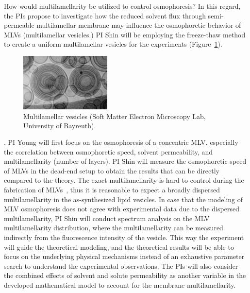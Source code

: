\documentclass[11pt]{article}
\begin{document}
How would multilamellarity be utilized to control osmophoresis?  In this
regard, the PIs propose to investigate how the reduced solvent flux
through semi-permeable multilamellar membrane may influence the
osmophoretic behavior of MLVs (multilamellar vesicles.) PI Shin will be
employing the freeze-thaw method to create a uniform multilamellar
vesicles for the experiments (Figure~\ref{fig:Multilamellar}).
\begin{figure}
\centerline{\includegraphics[width=1.8in]{figs/Multilamellar.pdf}}
\caption{\footnotesize Multilamellar vesicles (Soft Matter Electron Microscopy Lab, University of Bayreuth).}
\label{fig:Multilamellar}
\end{figure}
%
\cite{szoka1980}. 
PI Young will first focus on the osmophoresis of a concentric MLV,
especially the correlation between osmophoretic speed, solvent
permeability, and multilamellarity (number of layers).  PI Shin will
measure the osmophoretic speed of MLVs in the dead-end setup to obtain
the results that can be directly compared to the theory.  The exact
multilamellarity is hard to control during the fabrication of
MLVs~\cite{Lasic1988_BiochemJ}, thus it is reasonable to expect a
broadly dispersed multilamellarity in the as-synthesized lipid vesicles.
In case that the modeling of MLV osmophoresis does not agree with
experimental data due to the dispersed multilamellarity, PI Shin will
conduct spectrum analysis on the MLV multilamellarity distribution,
where the multilamellarity can be measured indirectly from the
fluorescence intensity of the vesicle.  This way the experiment will
guide the theoretical modeling, and the theoretical results will be able
to focus on the underlying physical mechanisms instead of an exhaustive
parameter search to understand the experimental observations.  The PIs
will also consider the combined effects of  solvent and solute
permeability as another variable in the developed mathematical model to
account for the membrane multilamellarity. 
\end{document}
